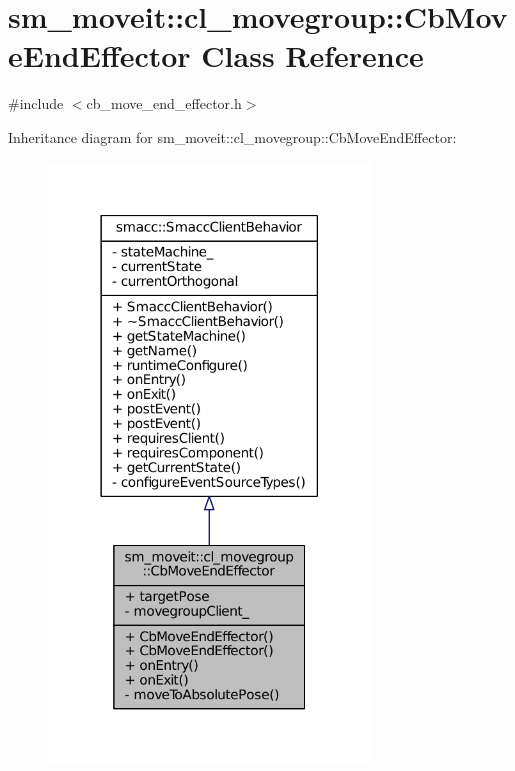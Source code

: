 \hypertarget{classsm__moveit_1_1cl__movegroup_1_1CbMoveEndEffector}{}\section{sm\+\_\+moveit\+:\+:cl\+\_\+movegroup\+:\+:Cb\+Move\+End\+Effector Class Reference}
\label{classsm__moveit_1_1cl__movegroup_1_1CbMoveEndEffector}


{\ttfamily \#include $<$cb\+\_\+move\+\_\+end\+\_\+effector.\+h$>$}



Inheritance diagram for sm\+\_\+moveit\+:\+:cl\+\_\+movegroup\+:\+:Cb\+Move\+End\+Effector\+:
\nopagebreak
\begin{figure}[H]
\begin{center}
\leavevmode
\includegraphics[width=242pt]{classsm__moveit_1_1cl__movegroup_1_1CbMoveEndEffector__inherit__graph}
\end{center}
\end{figure}


